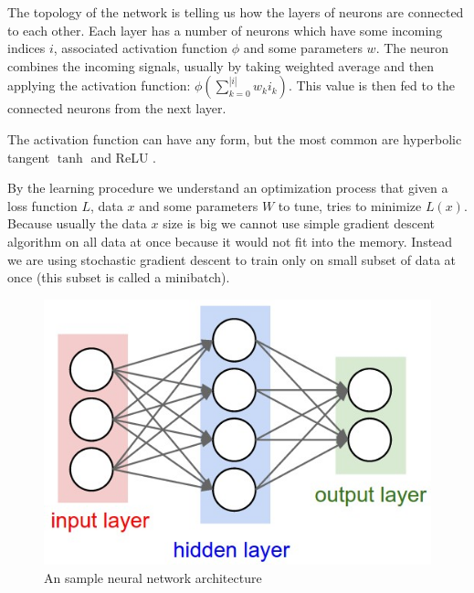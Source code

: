The topology of the network is telling us how the layers of neurons are connected
to each other. Each layer has a number of neurons which have some incoming
indices $i$, associated activation function $\phi$ and some parameters $w$.
The neuron combines the incoming signals, usually by taking weighted average
and then applying the activation function: $ \phi ( \sum_{k=0}^{|i|} w_ki_k ) $.
This value is then fed to the connected neurons from the next layer.

The activation function can have any form, but the most common are hyperbolic tangent
$\tanh$ and ReLU \cite{nair_rectified_2010}.

By the learning procedure we understand an optimization process that given a
loss function $L$, data $x$ and some parameters $W$ to tune, tries to minimize $L(x)$.
Because usually the data $x$ size is big we cannot use simple gradient descent
algorithm on all data at once because it would not fit into the memory. Instead
we are using stochastic gradient descent to train only on small subset of data
at once (this subset is called a minibatch).

\begin{figure}[!htbp]
  \centering
  \includegraphics[width=0.6\linewidth]{img/nn/neural_net.jpeg}
  \caption{An sample neural network architecture} 
  \label{fig:sample_nn}
\end{figure}

